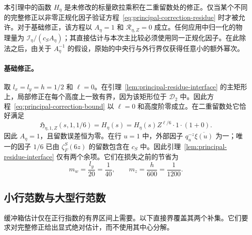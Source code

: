 \documentclass[11pt,a4paper]{article}
\numberwithin{equation}{section}
\numberwithin{figure}{section}
\theoremstyle{definition}
\theoremstyle{remark}
\begin{document}
本引理中的函数 $H_\eta$ 是未修改的标量欧拉乘积在二重留数处的修正。仅当某个不同的完整修正以非零正规化因子验证方程~\eqref{eq:principal-correction-residue} 时才被允许。对于基础修正，该方程以 $A_\eta=1$ 和 $\mathcal R_{\eta,Z}=0$ 成立。任何应用中归一化的物理量为 $\mathscr I_\eta/(c_SA_\eta)$；其直接估计与本次主比较必须使用同一正规化因子。在此除法之后，由关于 $A_\eta^{-1}$ 的假设，原始的中央行与外行界仅获得任意小的额外幂次。

\paragraph{基础修正。}

取 $l_x=l_y=h=1/2$ 和 $\ell=0$。在引理~\ref{lem:principal-residue-interface} 的主矩形上，局部修正在每个高度上一致有界，因为该矩形位于 $\mathcal D_2$ 中。因此方程~\eqref{eq:principal-correction-bound} 以 $\ell=0$ 和高度阶零成立。在二重留数处它恰好满足
\[
 \mathfrak H_{\eta,1,Z}(s,1,1/6)=H_\eta(s)
       =H_\eta(s)Z^{\ell/6}\cdot1\cdot(1+0).
\]
因此 $A_\eta=1$，且留数误差恒为零。在行 $u=1$ 中，外部因子 $q_u^{-z}\overline{\xi(u)}$ 为一；唯一的因子 $1/6$ 已由 $\zeta_F^S(6z)$ 的留数包含在 $c_S$ 中。因此引理~\ref{lem:principal-residue-interface} 仅有两个余项。它们在损失之前的节省为
\[
 m_w=\frac{l_y}{20}=\frac1{40},\qquad
 m_z=\frac h{600}=\frac1{1200}.
\]

\subsection{小行范数与大型行范数}

缓冲箱估计仅在正行指数的有界区间上需要。以下直接界覆盖其两个补集。它们要求对完整修正给出显式绝对估计，而不使用其中心分解。
\end{document}
